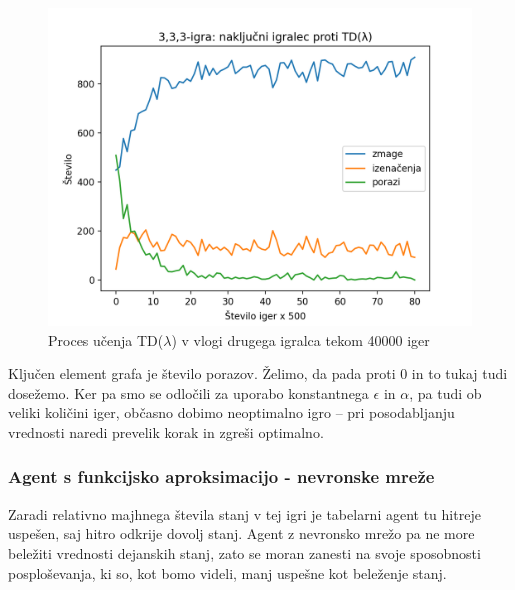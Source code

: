 \documentclass[12pt,a4paper]{amsart}
\theoremstyle{definition} %
\theoremstyle{plain} %
\begin{document}
\begin{figure}[H]
    \includegraphics[scale=0.8]{../rezultati/tdl-333-40000-2.png}
    \caption{Proces učenja TD($\lambda$) v vlogi drugega igralca tekom 40000 iger}
\end{figure}

Ključen element grafa je število porazov. Želimo, da pada proti $0$ in to tukaj tudi dosežemo. Ker pa 
smo se odločili za uporabo konstantnega $\epsilon$ in $\alpha$, pa tudi ob veliki količini iger, 
občasno dobimo neoptimalno igro -- pri posodabljanju vrednosti naredi prevelik korak in zgreši optimalno.

\subsubsection{Agent s funkcijsko aproksimacijo - nevronske mreže}
Zaradi relativno majhnega števila stanj v tej igri je tabelarni agent tu hitreje uspešen, saj hitro 
odkrije dovolj stanj. Agent z nevronsko mrežo pa ne more beležiti vrednosti dejanskih stanj, zato 
se moran zanesti na svoje sposobnosti posploševanja, ki so, kot bomo videli, manj uspešne kot beleženje 
stanj.
\end{document}
